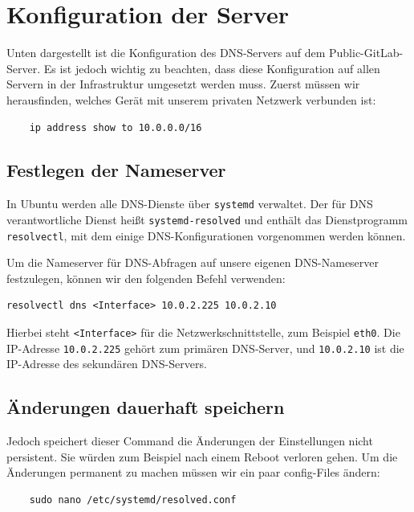 \documentclass[a4paper,12pt]{article}
\begin{document}
\section{Konfiguration der Server}

Unten dargestellt ist die Konfiguration des DNS-Servers auf dem Public-GitLab-Server. 
Es ist jedoch wichtig zu beachten, dass diese Konfiguration auf allen Servern in der Infrastruktur umgesetzt werden muss. 
Zuerst müssen wir herausfinden, welches Gerät mit unserem privaten Netzwerk verbunden ist:

\begin{verbatim}
	ip address show to 10.0.0.0/16
\end{verbatim}


\subsection{Festlegen der Nameserver}  
In Ubuntu werden alle DNS-Dienste über \texttt{systemd} verwaltet. Der für DNS verantwortliche Dienst heißt \texttt{systemd-resolved} und enthält das Dienstprogramm \texttt{resolvectl}, mit dem einige DNS-Konfigurationen vorgenommen werden können.  

Um die Nameserver für DNS-Abfragen auf unsere eigenen DNS-Nameserver festzulegen, können wir den folgenden Befehl verwenden:  

\begin{verbatim}
resolvectl dns <Interface> 10.0.2.225 10.0.2.10
\end{verbatim}  

Hierbei steht \texttt{<Interface>} für die Netzwerkschnittstelle, zum Beispiel \texttt{eth0}.  
Die IP-Adresse \texttt{10.0.2.225} gehört zum primären DNS-Server, und \texttt{10.0.2.10} ist die IP-Adresse des sekundären DNS-Servers. 






\subsection{Änderungen dauerhaft speichern}
Jedoch speichert dieser Command die Änderungen der Einstellungen nicht persistent. Sie würden zum Beispiel nach einem Reboot verloren gehen. 
Um die Änderungen permanent zu machen müssen wir ein paar config-Files ändern: \newline

\begin{verbatim}
	sudo nano /etc/systemd/resolved.conf
\end{verbatim}
\end{document}
